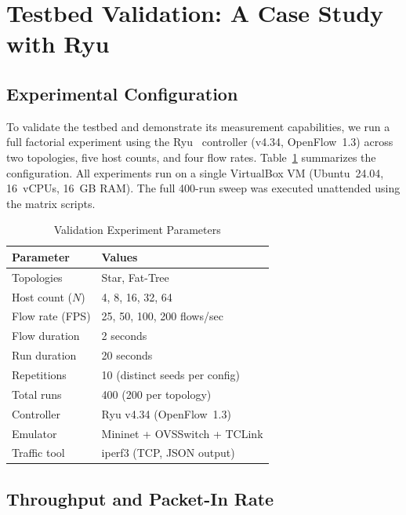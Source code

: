 \documentclass[conference]{IEEEtran}
\begin{document}
\section{Testbed Validation: A Case Study with Ryu}
\label{sec:demo}

\subsection{Experimental Configuration}

To validate the testbed and demonstrate its measurement
capabilities, we run a full factorial experiment using the
Ryu~\cite{RyuFramework} controller (v4.34, OpenFlow~1.3)
across two topologies, five host counts, and four flow rates.
Table~\ref{tab:params} summarizes the configuration.
All experiments run on a single VirtualBox VM (Ubuntu~24.04,
16~vCPUs, 16~GB RAM). The full 400-run sweep was executed
unattended using the matrix scripts.

\begin{table}[t]
\centering
\caption{Validation Experiment Parameters}
\label{tab:params}
\renewcommand{\arraystretch}{1.1}
\begin{tabular}{ll}
\toprule
\textbf{Parameter} & \textbf{Values} \\
\midrule
Topologies        & Star, Fat-Tree \\
Host count ($N$)  & 4, 8, 16, 32, 64 \\
Flow rate (FPS)   & 25, 50, 100, 200 flows/sec \\
Flow duration     & 2 seconds \\
Run duration      & 20 seconds \\
Repetitions       & 10 (distinct seeds per config) \\
Total runs        & 400 (200 per topology) \\
Controller        & Ryu v4.34 (OpenFlow~1.3) \\
Emulator          & Mininet + OVSSwitch + TCLink \\
Traffic tool      & iperf3 (TCP, JSON output) \\
\bottomrule
\end{tabular}
\end{table}

\subsection{Throughput and Packet-In Rate}
\end{document}
